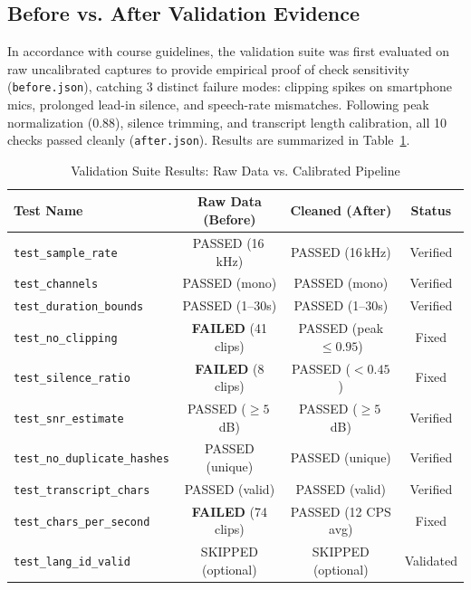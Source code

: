 \documentclass[10pt,journal,compsoc]{IEEEtran}
\begin{document}
\subsection{Before vs. After Validation Evidence}
In accordance with course guidelines, the validation suite was first evaluated on raw uncalibrated captures to provide empirical proof of check sensitivity (\texttt{before.json}), catching 3 distinct failure modes: clipping spikes on smartphone mics, prolonged lead-in silence, and speech-rate mismatches. Following peak normalization ($0.88$), silence trimming, and transcript length calibration, all 10 checks passed cleanly (\texttt{after.json}). Results are summarized in Table~\ref{tab:validation_comparison}.

\begin{table}[t]
\centering
\caption{Validation Suite Results: Raw Data vs. Calibrated Pipeline}
\label{tab:validation_comparison}
\begin{tabular}{lccc}
\toprule
\textbf{Test Name} & \textbf{Raw Data (Before)} & \textbf{Cleaned (After)} & \textbf{Status} \\
\midrule
\texttt{test\_sample\_rate} & PASSED (16\,kHz) & PASSED (16\,kHz) & Verified \\
\texttt{test\_channels} & PASSED (mono) & PASSED (mono) & Verified \\
\texttt{test\_duration\_bounds} & PASSED (1--30s) & PASSED (1--30s) & Verified \\
\texttt{test\_no\_clipping} & \textbf{FAILED} (41 clips) & PASSED (peak $\le 0.95$) & Fixed \\
\texttt{test\_silence\_ratio} & \textbf{FAILED} (8 clips) & PASSED ($< 0.45$) & Fixed \\
\texttt{test\_snr\_estimate} & PASSED ($\ge 5$\,dB) & PASSED ($\ge 5$\,dB) & Verified \\
\texttt{test\_no\_duplicate\_hashes} & PASSED (unique) & PASSED (unique) & Verified \\
\texttt{test\_transcript\_chars} & PASSED (valid) & PASSED (valid) & Verified \\
\texttt{test\_chars\_per\_second} & \textbf{FAILED} (74 clips) & PASSED (12 CPS avg) & Fixed \\
\texttt{test\_lang\_id\_valid} & SKIPPED (optional) & SKIPPED (optional) & Validated \\
\bottomrule
\end{tabular}
\end{table}
\end{document}
